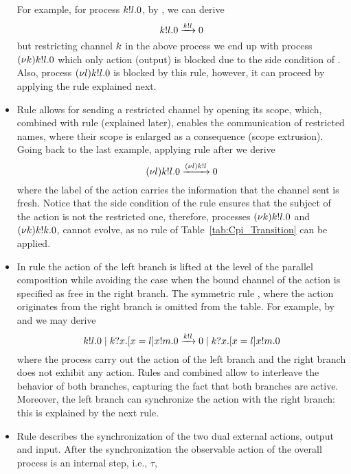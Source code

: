 \begin{itemize}
For example, for process $k!l.0$, by , we can derive 
\[k!l.0
\xrightarrow{k!l}
0
\]
but restricting channel $k$ in the above process we end up with process $(\nu k)k!l.0$  which only action (output) is blocked due to the side condition of . 
Also, process $(\nu l)k!l.0$ is blocked by this rule, however, it can proceed by applying the rule explained next.
%
%
\item Rule  allows for sending a restricted channel by opening its scope, 
which, combined with rule  (explained later), enables the communication of restricted names, where their scope is enlarged as a consequence (scope extrusion). 
Going back to the last example, applying rule  after  we derive
\[
(\nu l)k!l.0
\xrightarrow{(\nu l)k!l} 0
\]
where the label of the action carries the information that the channel sent is fresh. 
Notice that the side condition of the rule ensures that the subject of the action is not 
the restricted one, therefore, processes $(\nu k)k!l.0$ and $(\nu k)k!k.0$, cannot evolve, as no rule of Table~\ref{tab:Cpi_Transition} can be applied.
%
%
\item In rule  the action of the left branch is lifted at the level of the parallel composition while avoiding the case when the bound channel of the action is specified as free in the right branch. 
The symmetric rule , where the action originates from the right branch is omitted from the table.
For example, by  and  we may derive 
\[
k!l.0 \;|\; k?x.[ x = l ]x!m.0
\xrightarrow{k!l} 
0 \;|\; k?x.[ x = l ]x!m.0
\]
where the process carry out the action of the left branch and the right branch does not exhibit any action. 
Rules  and  combined allow to interleave the behavior of both branches, capturing the fact that both branches are active.
Moreover, the left branch can synchronize the action with the right branch: this is explained by the next rule.
%
%
\item Rule  describes the synchronization of the two dual external actions, output and input. 
After the synchronization the observable action of the overall process is an internal step, i.e., $\tau$, 

\end{itemize}
